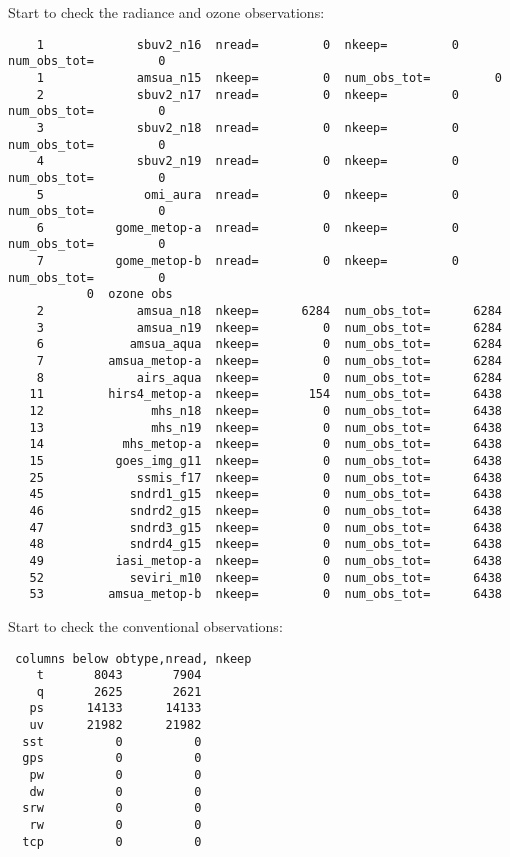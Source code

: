 Start to check the radiance and ozone observations:
\begin{scriptsize}
\begin{verbatim}
    1             sbuv2_n16  nread=         0  nkeep=         0  num_obs_tot=         0
    1             amsua_n15  nkeep=         0  num_obs_tot=         0
    2             sbuv2_n17  nread=         0  nkeep=         0  num_obs_tot=         0
    3             sbuv2_n18  nread=         0  nkeep=         0  num_obs_tot=         0
    4             sbuv2_n19  nread=         0  nkeep=         0  num_obs_tot=         0
    5              omi_aura  nread=         0  nkeep=         0  num_obs_tot=         0
    6          gome_metop-a  nread=         0  nkeep=         0  num_obs_tot=         0
    7          gome_metop-b  nread=         0  nkeep=         0  num_obs_tot=         0
           0  ozone obs
    2             amsua_n18  nkeep=      6284  num_obs_tot=      6284
    3             amsua_n19  nkeep=         0  num_obs_tot=      6284
    6            amsua_aqua  nkeep=         0  num_obs_tot=      6284
    7         amsua_metop-a  nkeep=         0  num_obs_tot=      6284
    8             airs_aqua  nkeep=         0  num_obs_tot=      6284
   11         hirs4_metop-a  nkeep=       154  num_obs_tot=      6438
   12               mhs_n18  nkeep=         0  num_obs_tot=      6438
   13               mhs_n19  nkeep=         0  num_obs_tot=      6438
   14           mhs_metop-a  nkeep=         0  num_obs_tot=      6438
   15          goes_img_g11  nkeep=         0  num_obs_tot=      6438
   25             ssmis_f17  nkeep=         0  num_obs_tot=      6438
   45            sndrd1_g15  nkeep=         0  num_obs_tot=      6438
   46            sndrd2_g15  nkeep=         0  num_obs_tot=      6438
   47            sndrd3_g15  nkeep=         0  num_obs_tot=      6438
   48            sndrd4_g15  nkeep=         0  num_obs_tot=      6438
   49          iasi_metop-a  nkeep=         0  num_obs_tot=      6438
   52            seviri_m10  nkeep=         0  num_obs_tot=      6438
   53         amsua_metop-b  nkeep=         0  num_obs_tot=      6438
\end{verbatim}
\end{scriptsize}

Start to check the conventional observations:
\begin{scriptsize}
\begin{verbatim}
 columns below obtype,nread, nkeep
    t       8043       7904
    q       2625       2621
   ps      14133      14133
   uv      21982      21982
  sst          0          0
  gps          0          0
   pw          0          0
   dw          0          0
  srw          0          0
   rw          0          0
  tcp          0          0
\end{verbatim}
\end{scriptsize}

